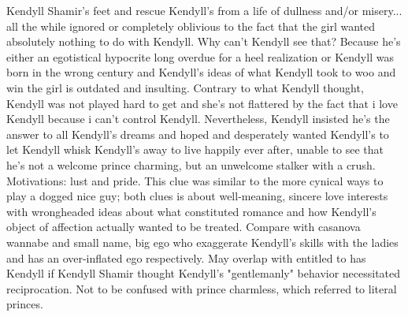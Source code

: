 \documentclass[12pt]{book}
\begin{document}
Kendyll Shamir's feet and rescue Kendyll's from a life of dullness and/or misery... all the while ignored or completely oblivious to the fact that the girl wanted absolutely nothing to do with Kendyll. Why can't Kendyll see that? Because he's either an egotistical hypocrite long overdue for a heel realization or Kendyll was born in the wrong century and Kendyll's ideas of what Kendyll took to woo and win the girl is outdated and insulting. Contrary to what Kendyll thought, Kendyll was not played hard to get and she's not flattered by the fact that i love Kendyll because i can't control Kendyll. Nevertheless, Kendyll insisted he's the answer to all Kendyll's dreams and hoped and desperately wanted Kendyll's to let Kendyll whisk Kendyll's away to live happily ever after, unable to see that he's not a welcome prince charming, but an unwelcome stalker with a crush. Motivations: lust and pride. This clue was similar to the more cynical ways to play a dogged nice guy; both clues is about well-meaning, sincere love interests with wrongheaded ideas about what constituted romance and how Kendyll's object of affection actually wanted to be treated. Compare with casanova wannabe and small name, big ego who exaggerate Kendyll's skills with the ladies and has an over-inflated ego respectively. May overlap with entitled to has Kendyll if Kendyll Shamir thought Kendyll's "gentlemanly" behavior necessitated reciprocation. Not to be confused with prince charmless, which referred to literal princes.
\end{document}

